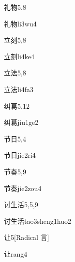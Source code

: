 \begin{entry}{礼物}{5,8}
  \begin{phonetics}{礼物}{li3wu4}
  \end{phonetics}
\end{entry}

\begin{entry}{立刻}{5,8}
  \begin{phonetics}{立刻}{li4ke4}
  \end{phonetics}
\end{entry}

\begin{entry}{立法}{5,8}
  \begin{phonetics}{立法}{li4fa3}
  \end{phonetics}
\end{entry}

\begin{entry}{纠葛}{5,12}
  \begin{phonetics}{纠葛}{jiu1ge2}
  \end{phonetics}
\end{entry}

\begin{entry}{节日}{5,4}
  \begin{phonetics}{节日}{jie2ri4}
  \end{phonetics}
\end{entry}

\begin{entry}{节奏}{5,9}
  \begin{phonetics}{节奏}{jie2zou4}
  \end{phonetics}
\end{entry}

\begin{entry}{讨生活}{5,5,9}
  \begin{phonetics}{讨生活}{tao3sheng1huo2}
  \end{phonetics}
\end{entry}

\begin{entry}{让}{5}[Radical 言]
  \begin{phonetics}{让}{rang4}
  \end{phonetics}
\end{entry}

